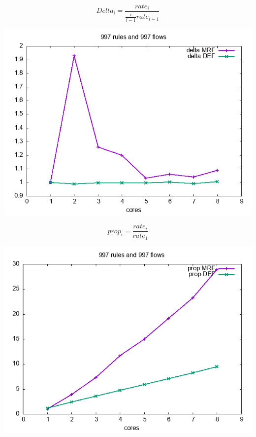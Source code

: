 \documentclass[11pt]{article}
\begin{document}
$$Delta_i=\frac{rate_i}{\frac{i}{i-1}rate_{i-1}}$$

\begin{center}
\includegraphics[width=.9\linewidth]{plot-997rules-997flows-delta.png}
\end{center}


$$prop_i=\frac{rate_i}{rate_1}$$

\begin{center}
\includegraphics[width=.9\linewidth]{plot-997rules-997flows-prop.png}
\end{center}
\end{document}
